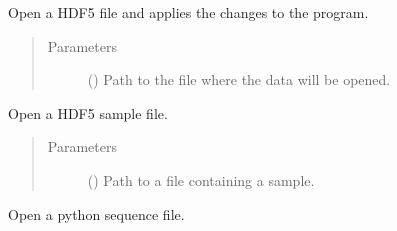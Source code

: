 \documentclass[a4paper,10pt,english]{sphinxmanual}
\begin{document}
\begin{fulllineitems}

\begin{fulllineitems}
\label{\detokenize{autodoc/mrsprint/mrsprint:mrsprint.mainwindow.MainWindow.open}}
Open a HDF5 file and applies the changes to the program.
\begin{quote}\begin{description}
\item[{Parameters}] \leavevmode
{} () \textendash{} Path to the file where the data will be opened.

\end{description}\end{quote}

\end{fulllineitems}


\begin{fulllineitems}
\label{\detokenize{autodoc/mrsprint/mrsprint:mrsprint.mainwindow.MainWindow.openSample}}
Open a HDF5 sample file.
\begin{quote}\begin{description}
\item[{Parameters}] \leavevmode
{} () \textendash{} Path to a file containing a sample.

\end{description}\end{quote}

\end{fulllineitems}


\begin{fulllineitems}
\label{\detokenize{autodoc/mrsprint/mrsprint:mrsprint.mainwindow.MainWindow.openSequence}}
Open a python sequence file.


\end{fulllineitems}
\end{fulllineitems}
\end{document}

